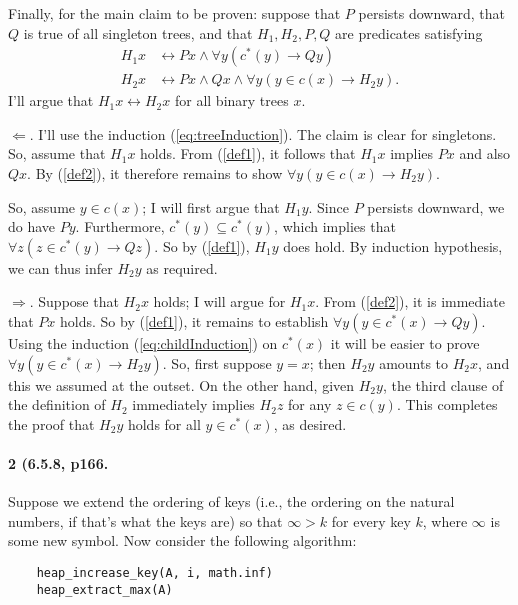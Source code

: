 \documentclass[
]{article}
\begin{document}
Finally, for the main claim to be proven: suppose that $P$ persists downward, that $Q$ is true of all singleton trees, and that $H_1, H_2, P, Q$ are predicates satisfying
\begin{align}
  \label{def1}
  H_1x
  &\leftrightarrow
    Px\land \forall y(c^*(y)\to Qy)\\
  \label{def2}
  H_2x
  &\leftrightarrow
    Px\land Qx \land \forall y(y\in c(x)\to H_2y).
\end{align}
I'll argue that $H_1x\leftrightarrow H_2x$ for all binary trees $x$.

$\Leftarrow$.  I'll use the induction (\ref{eq:treeInduction}).  The claim is clear for singletons.  So, assume that $H_1x$ holds.  From (\ref{def1}), it follows that $H_1x$ implies $Px$ and also $Qx$.  By (\ref{def2}), it therefore remains to show $\forall y(y\in c(x)\to H_2y)$.

So, assume $y\in c(x)$; I will first argue that $H_1y$.  Since $P$ persists downward, we do have $Py$.  Furthermore, $c^*(y)\subseteq c^*(y)$, which implies that $\forall z(z\in c^*(y)\to Qz)$.  So by (\ref{def1}), $H_1y$ does hold.  By induction hypothesis, we can thus infer $H_2y$ as required.

$\Rightarrow$.  Suppose that $H_2x$ holds;  I will argue for $H_1x$.  From (\ref{def2}), it is immediate that $Px$ holds.  So by (\ref{def1}), it remains to establish $\forall y(y\in c^*(x)\to Qy)$.  Using the induction (\ref{eq:childInduction}) on $c^*(x)$ it will be easier to prove $\forall y(y\in c^*(x)\to H_2y)$.  So, first suppose $y=x$; then $H_2y$ amounts to $H_2x$, and this we assumed at the outset. On the other hand, given $H_2y$, the third clause of the definition of $H_2$ immediately implies $H_2z$ for any $z\in c(y)$.  This completes the proof that $H_2y$ holds for all $y\in c^*(x)$, as desired.


\paragraph{2 (6.5.8, p166.}  Suppose we extend the ordering of keys (i.e., the ordering on the natural numbers, if that's what the keys are) so that $\infty>k$ for every key $k$, where $\infty$ is some new symbol.  Now consider the following algorithm:
\begin{verbatim}
    heap_increase_key(A, i, math.inf)
    heap_extract_max(A)
\end{verbatim}
\end{document}
